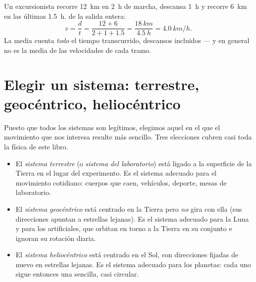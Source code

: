 \begin{example}\label{ex:g10:relative-motion:hike}
Un excursionista recorre \qty{12}{km} en \qty{2}{h} de marcha, descansa
\qty{1}{h} y recorre \qty{6}{km} en las últimas \qty{1.5}{h}.  de la salida entera:
\[
v = \frac{d}{t} = \frac{12 + 6}{2 + 1 + 1.5}
= \frac{\qty{18}{km}}{\qty{4.5}{h}} = \qty{4.0}{km/h}.
\]
La media cuenta \emph{todo} el tiempo transcurrido, descansos incluidos
--- y en general no es la media de las velocidades de cada tramo.
\end{example}

\section{Elegir un sistema: terrestre, geocéntrico, heliocéntrico}

Puesto que todos los sistemas son legítimos, elegimos aquel en el que el
movimiento que nos interesa resulte más sencillo. Tres elecciones cubren
casi toda la física de este libro.

\begin{definition}\label{def:g10:relative-motion:frames}
\begin{itemize}
  \item El \emph{sistema terrestre} (o
        \emph{sistema del laboratorio})
        está ligado a la superficie de la Tierra en el lugar del
        experimento. Es el sistema adecuado para el movimiento
        cotidiano: cuerpos que caen, vehículos, deporte, mesas de
        laboratorio.
  \item El \emph{sistema geocéntrico} está
        centrado en la Tierra pero \emph{no} gira con ella (sus
        direcciones apuntan a estrellas lejanas). Es el sistema adecuado
        para la Luna y para los  artificiales, que orbitan en
        torno a la Tierra en su conjunto e ignoran su rotación diaria.
  \item El \emph{sistema heliocéntrico}
        está centrado en el Sol, con direcciones fijadas de nuevo en
        estrellas lejanas. Es el sistema adecuado para los planetas:
        cada uno sigue entonces una  sencilla, casi circular.
\end{itemize}
\end{definition}

